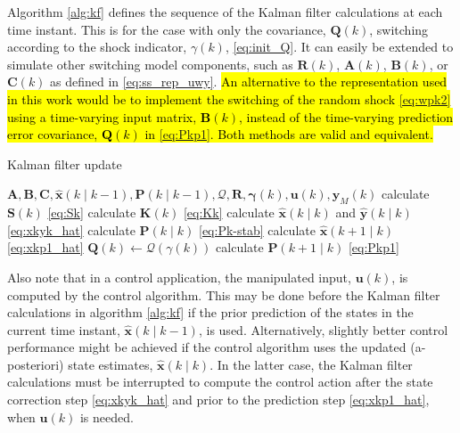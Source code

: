 {Algorithm \ref{alg:kf} defines the sequence of the Kalman filter calculations at each time instant. 
%
This is for the case with only the covariance, $\mathbf{Q}(k)$, switching according to the shock indicator, $\gamma(k)$, \eqref{eq:init_Q}. It can easily be extended to simulate other switching model components, such as $\mathbf{R}(k)$, $\mathbf{A}(k)$, $\mathbf{B}(k)$, or $\mathbf{C}(k)$ as defined in \eqref{eq:ss_rep_uwy}. \hl{An alternative to the representation used in this work would be to implement the switching of the random shock {\eqref{eq:wpk2}} using a time-varying input matrix, $\mathbf{B}(k)$, instead of the time-varying prediction error covariance, $\mathbf{Q}(k)$ in {\eqref{eq:Pkp1}}. Both methods are valid and equivalent.}
\begin{algorithm}
	\caption{Kalman filter update}\label{alg:kf}
	\begin{algorithmic}
		\Require $\mathbf{A},\mathbf{B},\mathbf{C},\mathbf{\hat{x}}(k \mid k-1), \mathbf{P}(k \mid k-1), \mathcal{Q}, \mathbf{R}, \mathbf{\gamma}(k), \mathbf{u}(k), \mathbf{y}_M(k)$
		\State calculate $\mathbf{S}(k)$ \eqref{eq:Sk}
		\State calculate $\mathbf{K}(k)$ \eqref{eq:Kk}
		\State calculate $\mathbf{\hat{x}}(k \mid k)$ and $\mathbf{\hat{y}}(k \mid k)$ \eqref{eq:xkyk_hat}
		\State calculate $\mathbf{P}(k \mid k)$ \eqref{eq:Pk-stab}
		\State calculate $\mathbf{\hat{x}}(k+1 \mid k)$ \eqref{eq:xkp1_hat}
		\State $\mathbf{Q}(k) \gets \mathcal{Q}(\gamma(k))$
		\State calculate $\mathbf{P}(k+1 \mid k)$ \eqref{eq:Pkp1}
	\end{algorithmic}
\end{algorithm}

Also note that in a control application, the manipulated input, $\mathbf{u}(k)$, is computed by the control algorithm. This may be done before the Kalman filter calculations in algorithm \ref{alg:kf} if the prior prediction of the states in the current time instant, $\hat{\mathbf{x}}(k \mid k-1)$, is used. Alternatively, slightly better control performance might be achieved if the control algorithm uses the updated (a-posteriori) state estimates, $\hat{\mathbf{x}}(k \mid k)$. In the latter case, the Kalman filter calculations must be interrupted to compute the control action after the state correction step \eqref{eq:xkyk_hat} and prior to the prediction step \eqref{eq:xkp1_hat}, when $\mathbf{u}(k)$ is needed.

}
